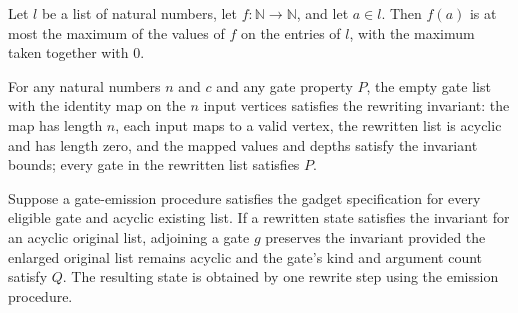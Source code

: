 \begin{theorem}
\label{BoolCircuit.le_foldr_max'}
\leanok
{}
Let $l$ be a list of natural numbers, let $f:\mathbb{N}\to\mathbb{N}$, and let $a\in l$.
Then $f(a)$ is at most the maximum of the values of $f$ on the entries of $l$, with the
maximum taken together with $0$.
\end{theorem}

\begin{theorem}
\label{BoolCircuit.rewriteInv_nil}
\leanok
{}
For any natural numbers $n$ and $c$ and any gate property $P$, the empty gate list with
the identity map on the $n$ input vertices satisfies the rewriting invariant: the map
has length $n$, each input maps to a valid vertex, the rewritten list is acyclic and has
length zero, and the mapped values and depths satisfy the invariant bounds; every gate
in the rewritten list satisfies $P$.
\end{theorem}

\begin{theorem}
\label{BoolCircuit.rewriteInv_step}
\leanok
{}
Suppose a gate-emission procedure satisfies the gadget specification for every eligible
gate and acyclic existing list. If a rewritten state satisfies the invariant for an
acyclic original list, adjoining a gate $g$ preserves the invariant provided the
enlarged original list remains acyclic and the gate's kind and argument count satisfy
$Q$. The resulting state is obtained by one rewrite step using the emission procedure.
\end{theorem}

